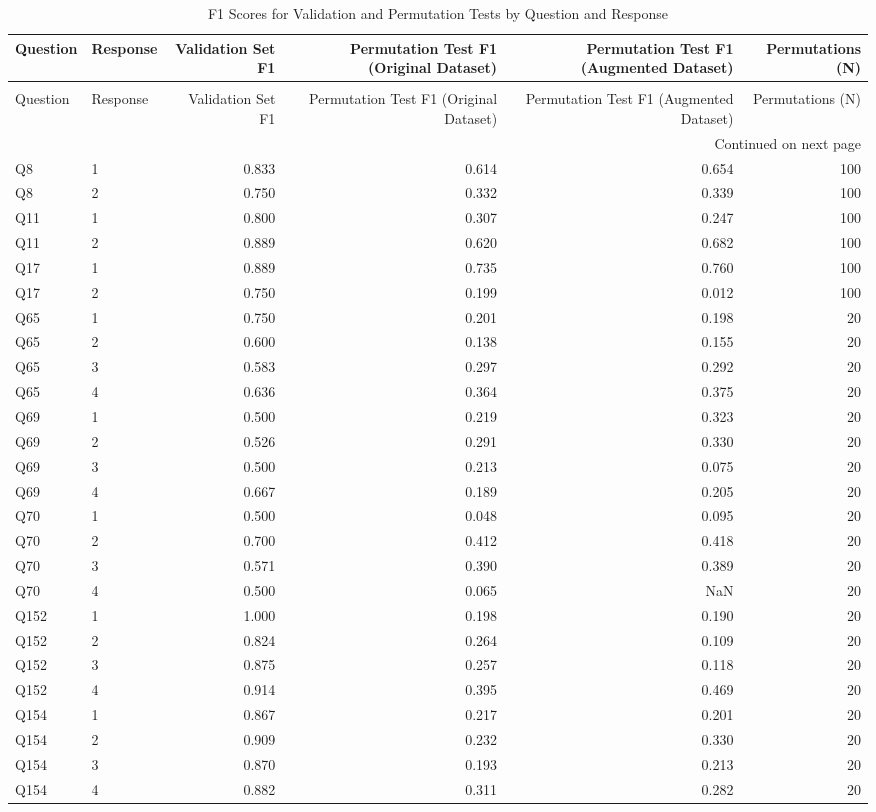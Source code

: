 \begin{longtable}{llrrrr}
\caption{F1 Scores for Validation and Permutation Tests by Question and Response} \label{tab:f1_scores_table} \\
\toprule
Question & Response & Validation Set F1 & Permutation Test F1 (Original Dataset) & Permutation Test F1 (Augmented Dataset) & Permutations (N) \\
\midrule
\endfirsthead
\caption[]{F1 Scores for Validation and Permutation Tests by Question and Response} \\
\toprule
Question & Response & Validation Set F1 & Permutation Test F1 (Original Dataset) & Permutation Test F1 (Augmented Dataset) & Permutations (N) \\
\midrule
\endhead
\midrule
\multicolumn{6}{r}{Continued on next page} \\
\midrule
\endfoot
\bottomrule
\endlastfoot
Q8 & 1 & 0.833 & 0.614 & 0.654 & 100 \\
Q8 & 2 & 0.750 & 0.332 & 0.339 & 100 \\
Q11 & 1 & 0.800 & 0.307 & 0.247 & 100 \\
Q11 & 2 & 0.889 & 0.620 & 0.682 & 100 \\
Q17 & 1 & 0.889 & 0.735 & 0.760 & 100 \\
Q17 & 2 & 0.750 & 0.199 & 0.012 & 100 \\
Q65 & 1 & 0.750 & 0.201 & 0.198 & 20 \\
Q65 & 2 & 0.600 & 0.138 & 0.155 & 20 \\
Q65 & 3 & 0.583 & 0.297 & 0.292 & 20 \\
Q65 & 4 & 0.636 & 0.364 & 0.375 & 20 \\
Q69 & 1 & 0.500 & 0.219 & 0.323 & 20 \\
Q69 & 2 & 0.526 & 0.291 & 0.330 & 20 \\
Q69 & 3 & 0.500 & 0.213 & 0.075 & 20 \\
Q69 & 4 & 0.667 & 0.189 & 0.205 & 20 \\
Q70 & 1 & 0.500 & 0.048 & 0.095 & 20 \\
Q70 & 2 & 0.700 & 0.412 & 0.418 & 20 \\
Q70 & 3 & 0.571 & 0.390 & 0.389 & 20 \\
Q70 & 4 & 0.500 & 0.065 & NaN & 20 \\
Q152 & 1 & 1.000 & 0.198 & 0.190 & 20 \\
Q152 & 2 & 0.824 & 0.264 & 0.109 & 20 \\
Q152 & 3 & 0.875 & 0.257 & 0.118 & 20 \\
Q152 & 4 & 0.914 & 0.395 & 0.469 & 20 \\
Q154 & 1 & 0.867 & 0.217 & 0.201 & 20 \\
Q154 & 2 & 0.909 & 0.232 & 0.330 & 20 \\
Q154 & 3 & 0.870 & 0.193 & 0.213 & 20 \\
Q154 & 4 & 0.882 & 0.311 & 0.282 & 20 \\
\end{longtable}
